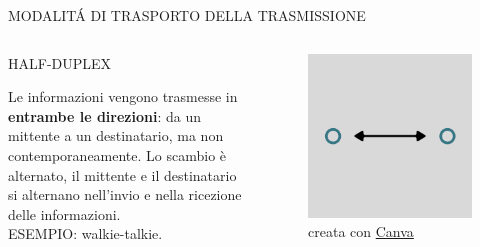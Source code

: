 \documentclass[aspectratio=1610]{beamer}
\begin{document}
\begin{frame}{MODALIT\'A DI TRASPORTO DELLA TRASMISSIONE}
    \begin{columns}
        \begin{alertblock}{HALF-DUPLEX}
            \begin{minipage}{0.96\linewidth}
                \justifying
                Le informazioni vengono trasmesse in \textbf{entrambe le direzioni}: da un mittente a un 
                destinatario, ma non contemporaneamente. Lo scambio è alternato, il mittente e il destinatario si alternano
                nell'invio e nella ricezione delle informazioni.\\
                ESEMPIO: walkie-talkie.
            \end{minipage}
        \end{alertblock}
           \begin{figure}
               \includegraphics[width=\linewidth]{img/halfduplex.png}
               \caption{{creata con \href{https://www.canva.com}{Canva}}}
           \end{figure}
    \end{columns}
\end{frame}
\end{document}
